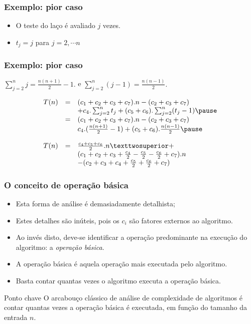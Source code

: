 \documentclass{beamer}
\begin{document}
\begin{frame}

\frametitle{Exemplo: pior caso}

  

  \begin{itemize}
    \item O teste do laço é avaliado $j$ vezes.
    \item $t_j = j$ para $j = 2, \cdots n$
  \end{itemize}

\end{frame}

\begin{frame}

\frametitle{Exemplo: pior caso}

$\sum_{j=2}^{n} j = \frac{n(n+1)}{2} - 1.$
e
$\sum_{j=2}^{n} (j-1) = \frac{n(n-1)}{2}.$

  $$
  \begin{array}{rcl}
    T(n) & = & (c_1+c_2+c_3+c_7).n  - (c_2 + c_3 + c_7) \\
    & & + c_4.\sum_{j=2}^{n} t_j+ (c_5+c_6).\sum_{j=2}^{n} (t_j-1) \pause \\
    & = & (c_1+c_2+c_3+c_7).n - (c_2 + c_3 + c_7) \\
    & & c_4.(\frac{n(n+1)}{2} - 1) + (c_5+c_6).\frac{n(n-1)}{2} \pause \\
    \\
    T(n)
    & = & \frac{c_4+c_5+c_6}{2}.n² + \\
    & &   (c_1+c_2+c_3+\frac{c_4}{2}-\frac{c_5}{2}-\frac{c_6}{2} + c_7).n \\
    & & - (c_2 + c_3 + c_4 + \frac{c_5}{2} + \frac{c_6}{2} + c_7)
  \end{array}
  $$

\end{frame}

\begin{frame}
\frametitle{O conceito de operação básica}

\begin{itemize}
\item Esta forma de análise é demasiadamente detalhista;
\item Estes detalhes são inúteis, pois os $c_i$ são fatores externos ao
  algoritmo.
\item Ao invés disto, deve-se identificar a operação predominante na execução
  do algoritmo: a \emph{operação básica}.
\item A operação básica é aquela operação mais executada pelo algoritmo.
\item Basta contar quantas vezes o algoritmo executa a operação básica.
\end{itemize}
\begin{block}{Ponto chave}
O arcabouço clássico de análise de complexidade de algoritmos é contar quantas vezes a operação básica é executada, em função do tamanho da entrada $n$.
\end{block}
\end{frame}
\end{document}

